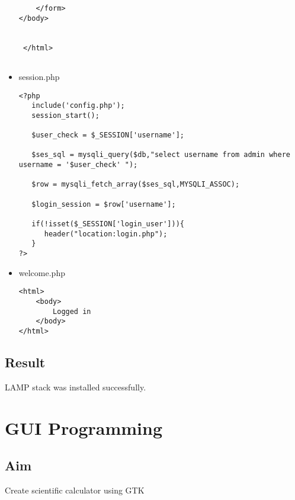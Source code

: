 \documentclass{article}
\begin{document}
\begin{itemize}
\begin{verbatim}
	</form>
</body>


 </html>
 
\end{verbatim}

\item session.php

\begin{verbatim}
<?php
   include('config.php');
   session_start();
   
   $user_check = $_SESSION['username'];
   
   $ses_sql = mysqli_query($db,"select username from admin where username = '$user_check' ");
   
   $row = mysqli_fetch_array($ses_sql,MYSQLI_ASSOC);
   
   $login_session = $row['username'];
   
   if(!isset($_SESSION['login_user'])){
      header("location:login.php");
   }
?>
\end{verbatim}

\item welcome.php

\begin{verbatim}
<html>
	<body>
		Logged in
	</body>
</html>
\end{verbatim}

\end{itemize}
\subsection{Result}
LAMP stack was installed successfully.

\newpage
\section{GUI Programming}

\subsection{Aim}
 Create scientific calculator using GTK
 
 
 
 










	
\end{document}
